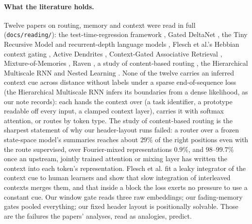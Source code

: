 \documentclass[11pt]{article}
\begin{document}
\paragraph{What the literature holds.} Twelve papers on routing, memory and context were read in full (\texttt{docs/reading/}): the test-time-regression framework \cite{ttr}, Gated DeltaNet \cite{gdn}, the Tiny Recursive Model and recurrent-depth language models \cite{trm, recdepth}, Flesch et al.'s Hebbian context gating \cite{flesch}, Active Dendrites \cite{dendrites}, Context-Gated Associative Retrieval \cite{cgar}, Mixture-of-Memories \cite{mom}, Raven \cite{raven}, a study of content-based routing \cite{routing}, the Hierarchical Multiscale RNN \cite{hmrnn} and Nested Learning \cite{nested}. None of the twelve carries an inferred context cue across distance without labels under a sparse end-of-sequence loss (the Hierarchical Multiscale RNN infers its boundaries from a dense likelihood, as our note records): each hands the context over (a task identifier, a prototype readable off every input, a clamped context layer), carries it with softmax attention, or routes by token type. The study of content-based routing is the sharpest statement of why our header-layout runs failed: a router over a frozen state-space model's summaries reaches about $29\%$ of the right positions even with the route supervised, over Fourier-mixed representations $0.9\%$, and $98$--$99.7\%$ once an upstream, jointly trained attention or mixing layer has written the context into each token's representation. Flesch et al. fit a leaky integrator of the context cue to human learners and show that slow integration of interleaved contexts merges them, and that inside a block the loss exerts no pressure to use a constant cue. Our window gate reads three raw embeddings; our fading-memory gates pooled everything; our fixed header layout is positionally solvable. Those are the failures the papers' analyses, read as analogies, predict.
\end{document}
